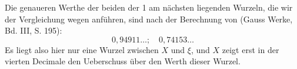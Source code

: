 
Die genaueren Werthe der beiden der 1 am nächsten liegenden Wurzeln, die wir der Vergleichung wegen anführen, sind nach der Berechnung von  (Gauss Werke, Bd. III, S. 195):
\[
0,94911 \ldots; \quad 0,74153 \ldots
\]
Es liegt also hier nur eine Wurzel zwischen $X$ und $\xi$, und $X$ zeigt erst in der vierten Decimale den Ueberschuss über den Werth dieser Wurzel.
